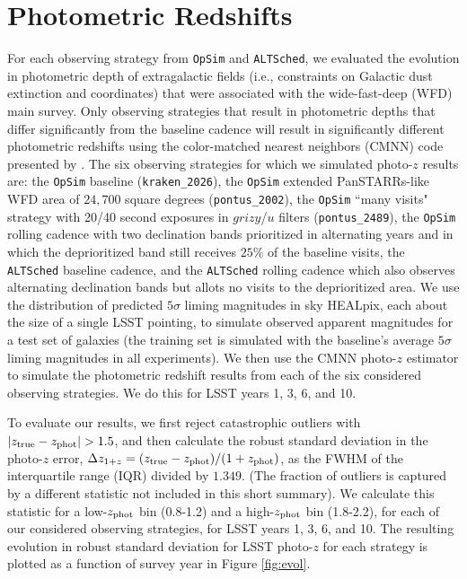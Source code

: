 \section{Photometric Redshifts}\label{mlg_sec:pz_summary}

For each observing strategy from {\tt OpSim} and {\tt ALTSched}, we evaluated the evolution in photometric depth of extragalactic fields (i.e., constraints on Galactic dust extinction and coordinates) that were associated with the wide-fast-deep (WFD) main survey. Only observing strategies that result in photometric depths that differ significantly from the baseline cadence will result in significantly different photometric redshifts using the color-matched nearest neighbors (CMNN) code presented by \cite{2018AJ....155....1G}. The six observing strategies for which we simulated photo-$z$ results are: the {\tt OpSim} baseline ({\tt kraken\_2026}), the {\tt OpSim} extended PanSTARRs-like WFD area of $24,700$ square degrees ({\tt pontus\_2002}), the {\tt OpSim}  ``many visits" strategy with 20/40 second exposures in $grizy$/$u$ filters ({\tt pontus\_2489}), the {\tt OpSim} rolling cadence with two declination bands prioritized in alternating years and in which the deprioritized band still receives $25\%$ of the baseline visits, the {\tt ALTSched} baseline cadence, and the {\tt ALTSched} rolling cadence which also observes alternating declination bands but allots no visits to the deprioritized area. We use the distribution of predicted $5{\sigma}$ liming magnitudes in sky HEALpix, each about the size of a single LSST pointing, to simulate observed apparent magnitudes for a test set of galaxies (the training set is simulated with the baseline's average $5{\sigma}$ liming magnitudes in all experiments). We then use the CMNN photo-$z$ estimator to simulate the photometric redshift results from each of the six considered observing strategies. We do this for LSST years 1, 3, 6, and 10.

To evaluate our results, we first reject catastrophic outliers with $|z_{\rm true}-z_{\rm phot}|>1.5$, and then 
calculate the robust standard deviation in the photo-$z$ error, $\Delta z _{1+z} = (z_{\rm true}-z_{\rm phot})/(1+z_{\rm 
phot})$, as the FWHM of the interquartile range (IQR) divided by $1.349$. (The fraction of outliers is captured by a 
different statistic not included in this short summary). We calculate this statistic for a low-$z_{\rm phot}$ bin 
(0.8-1.2) and a high-$z_{\rm phot}$ bin (1.8-2.2), for each of our considered observing strategies, for LSST years 1, 3, 
6, and 10. The resulting evolution in robust standard deviation for LSST photo-$z$ for each strategy is plotted as a 
function of survey year in Figure \ref{fig:evol}.

